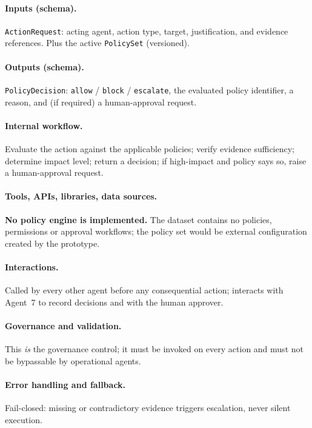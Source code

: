 \documentclass[11pt,a4paper]{article}
\newcommand{\code}[1]{\texttt{#1}}
\begin{document}
\paragraph{Inputs (schema).} \code{ActionRequest}: acting agent, action type, target, justification, and evidence references. Plus the active \code{PolicySet} (versioned).

\paragraph{Outputs (schema).} \code{PolicyDecision}: \code{allow} / \code{block} / \code{escalate}, the evaluated policy identifier, a reason, and (if required) a human-approval request.

\paragraph{Internal workflow.} Evaluate the action against the applicable policies; verify evidence sufficiency; determine impact level; return a decision; if high-impact and policy says so, raise a human-approval request.

\paragraph{Tools, APIs, libraries, data sources.} \textbf{No policy engine is implemented.} The dataset contains no policies, permissions or approval workflows; the policy set would be external configuration created by the prototype.

\paragraph{Interactions.} Called by every other agent before any consequential action; interacts with Agent~7 to record decisions and with the human approver.

\paragraph{Governance and validation.} This \emph{is} the governance control; it must be invoked on every action and must not be bypassable by operational agents.

\paragraph{Error handling and fallback.} Fail-closed: missing or contradictory evidence triggers escalation, never silent execution.
\end{document}
